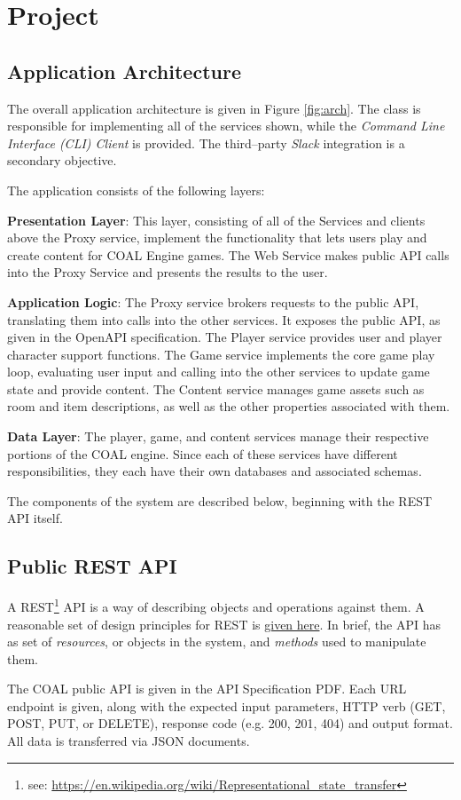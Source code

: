 \documentclass{article}
\newcommand{\enterProblemHeader}[1]{
}
\newcommand{\exitProblemHeader}[1]{
\nobreak\extramarks{#1}{}\nobreak
}
\newcounter{homeworkProblemCounter} %
\newcommand{\homeworkProblemName}{}
\newenvironment{homeworkProblem}[1][Problem \arabic{homeworkProblemCounter}]{ %
\stepcounter{homeworkProblemCounter} %
\renewcommand{\homeworkProblemName}{#1} %
\section{\homeworkProblemName} %
\enterProblemHeader{\homeworkProblemName} %
}{
\exitProblemHeader{\homeworkProblemName} %
}
\newcommand{\homeworkSectionName}{}
\newenvironment{homeworkSection}[1]{ %
\renewcommand{\homeworkSectionName}{#1} %
\subsection{\homeworkSectionName} %
\enterProblemHeader{\homeworkProblemName\ [\homeworkSectionName]} %
}{
\enterProblemHeader{\homeworkProblemName} %
}
\begin{document}
\begin{homeworkProblem}[Project]
\begin{homeworkSection}{Application Architecture}
The overall application architecture is given in Figure \ref{fig:arch}. The class is responsible for implementing all of the services shown, while the \textit{Command Line Interface (CLI) Client} is provided. The third--party \textit{Slack} integration is a secondary objective.

The application consists of the following layers:

\begin{compactitem}
	\item \textbf{Presentation Layer}: This layer, consisting of all of the Services and clients above the Proxy service, implement the functionality that lets users play and create content for COAL Engine games. The Web Service makes public API calls into the Proxy Service and presents the results to the user.
	\item \textbf{Application Logic}: The Proxy service brokers requests to the public API, translating them into calls into the other services. It exposes the public API, as given in the OpenAPI specification. The Player service provides user and player character support functions. The Game service implements the core game play loop, evaluating user input and calling into the other services to update game state and provide content. The Content service manages game assets such as room and item descriptions, as well as the other properties associated with them.
	\item \textbf{Data Layer}: The player, game, and content services manage their respective portions of the COAL engine. Since each of these services have different responsibilities, they each have their own databases and associated schemas.
\end{compactitem}

The components of the system are described below, beginning with the REST API itself.
\end{homeworkSection}


\begin{homeworkSection}{Public REST API}
	A REST\footnote{see: \url{https://en.wikipedia.org/wiki/Representational_state_transfer}} API is a way of describing objects and operations against them. A reasonable set of design principles for REST is \href{https://restfulapi.net/}{given here}. In brief, the API has as set of \textit{resources}, or objects in the system, and \textit{methods} used to manipulate them.

	The COAL public API is given in the API Specification PDF. Each URL endpoint is given, along with the expected input parameters, HTTP verb (GET, POST, PUT, or DELETE),  response code (e.g. 200, 201, 404) and output format. All data is transferred via JSON documents.


\end{homeworkSection}
\end{homeworkProblem}
\end{document}
